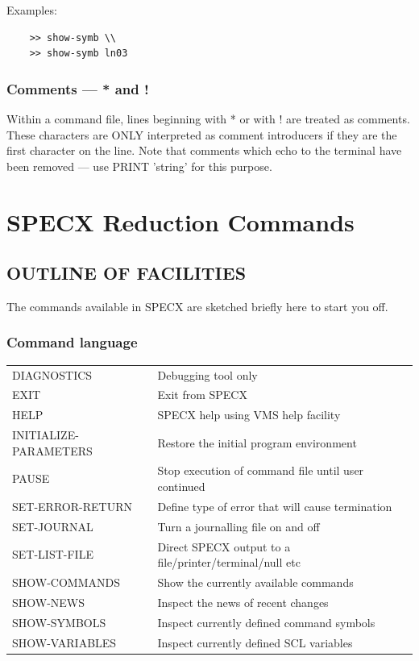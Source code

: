 \documentclass[11pt,twoside]{report}
\begin{document}
Examples:  
\begin{verbatim}
    >> show-symb \\
    >> show-symb ln03
\end{verbatim}

\subsection{Comments --- * and !}\index{*}

Within a command file, lines beginning with * or with ! are treated as
comments. These characters are ONLY interpreted as comment introducers if they
are the first character on the line. Note that comments which echo to the 
terminal have been removed --- use PRINT 'string' for this purpose.

\chapter{SPECX Reduction Commands}
\section{OUTLINE OF FACILITIES}

The commands available in SPECX are sketched briefly here to start you off.

\subsection{Command language}

\begin{tabular}{ll}
DIAGNOSTICS            & Debugging tool only\\
EXIT                   & Exit from SPECX\\
HELP                   & SPECX help using VMS help facility\\
INITIALIZE-PARAMETERS  & Restore the initial program environment\\
PAUSE                  & Stop execution of command file until user continued\\
SET-ERROR-RETURN       & Define type of error that will cause termination\\
SET-JOURNAL            & Turn a journalling file on and off\\
SET-LIST-FILE          & Direct SPECX output to a file/printer/terminal/null etc\\
SHOW-COMMANDS          & Show the currently available commands\\
SHOW-NEWS              & Inspect the news of recent changes\\
SHOW-SYMBOLS           & Inspect currently defined command symbols\\
SHOW-VARIABLES         & Inspect currently defined SCL variables\\
\end{tabular}
\end{document}
